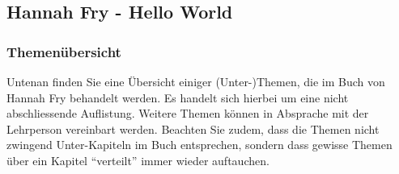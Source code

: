 
\pagestyle{empty}
\footnotesize

\begin{landscape}
	\part*{Hannah Fry - Hello World}
	\section{Themenübersicht}
	Untenan finden Sie eine Übersicht einiger (Unter-)Themen, die im Buch von Hannah Fry behandelt werden. Es handelt sich hierbei um eine nicht abschliessende Auflistung. Weitere Themen können in Absprache mit der Lehrperson vereinbart werden. Beachten Sie zudem, dass die Themen nicht zwingend Unter-Kapiteln im Buch entsprechen, sondern dass gewisse Themen über ein Kapitel ``verteilt'' immer wieder auftauchen.
	\label{sec:themen}


\end{landscape}
